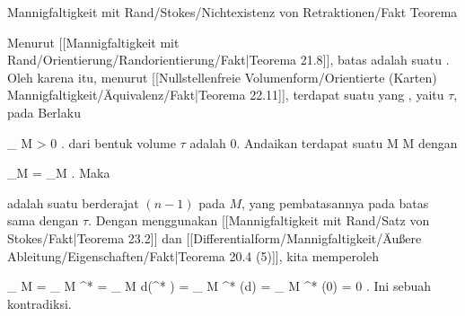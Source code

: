 {Mannigfaltigkeit mit Rand/Stokes/Nichtexistenz von Retraktionen/Fakt}
{Teorema}
{}
{

\faktzusatz {}
\faktzusatz {}

}
{

Menurut
[[Mannigfaltigkeit mit Rand/Orientierung/Randorientierung/Fakt|Teorema 21.8]],
batas
 adalah suatu
 {} {.}
Oleh karena itu, menurut
[[Nullstellenfreie Volumenform/Orientierte (Karten) Mannigfaltigkeit/Äquivalenz/Fakt|Teorema 22.11]],
terdapat suatu
yang
,
yaitu $\tau$, pada
 Berlaku

\mavergleichskette
{\vergleichskette
{
\int_{  \partial M  }  \tau
}
{ > }{ 0
}
{  }{
}
{    }{
}
{   }{
}
}
{}{}{.}
dari bentuk volume $\tau$ adalah $0$.
Andaikan terdapat suatu
\maabbdisp {\varphi} { M } { \partial M
} {}
dengan

\mavergleichskette
{\vergleichskette
{ \varphi \vert_{\partial M}
}
{ = }{ _{\partial M}
}
{  }{
}
{    }{
}
{   }{
}
}
{}{}{.}
Maka

\mathl{\varphi^* \tau}{} adalah suatu
berderajat $(n-1)$ pada $M$, yang pembatasannya pada batas sama dengan $\tau$. Dengan menggunakan
[[Mannigfaltigkeit mit Rand/Satz von Stokes/Fakt|Teorema 23.2]]
dan
[[Differentialform/Mannigfaltigkeit/Äußere Ableitung/Eigenschaften/Fakt|Teorema 20.4 (5)]],
kita memperoleh

\mavergleichskettealign
{\vergleichskettealign
{
\int_{  \partial M  }   \tau
}
{ =} {
\int_{  \partial  M  }   \varphi^* \tau
}
{ =} {
\int_{  M  }   d(\varphi^* \tau)
}
{ =} {
\int_{  M  }   \varphi^* (d\tau)
}
{ =} {
\int_{  M  }   \varphi^* (0)
}
}
{
\vergleichskettefortsetzungalign
{ =} { 0
}
{ } {}
{ } {}
{ } {}
}
{}{.}
Ini sebuah kontradiksi.

}

